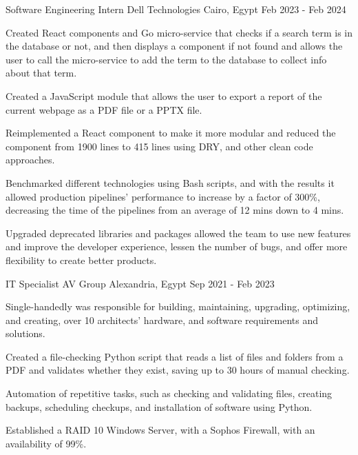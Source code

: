 \begin{cventries}
  \cventry
   {Software Engineering Intern} %
    {Dell Technologies} %
    {Cairo, Egypt} %
    {Feb 2023 - Feb 2024} %
    {
      \begin{cvitems} %
        \item {Created React components and Go micro-service that checks if a search term is in the database or not, and then displays a component if not found and allows the user to call the micro-service to add the term to the database to collect info about that term.}
        \item {Created a JavaScript module that allows the user to export a report of the current webpage as a PDF file or a PPTX file.}
        \item {Reimplemented a React component to make it more modular and reduced the component from 1900 lines to 415 lines using DRY, and other clean code approaches.}
        \item{Benchmarked different technologies using Bash scripts, and with the results it allowed production pipelines’ performance to increase by a factor of 300\%, decreasing the time of the pipelines from an average of 12 mins down to 4 mins.}
        \item{Upgraded deprecated libraries and packages allowed the team to use new features and improve the developer experience, lessen the number of bugs, and offer more flexibility to create better products.}
      \end{cvitems}
    }
    
     \cventry
    {IT Specialist} %
    {AV Group} %
    {Alexandria, Egypt} %
    {Sep 2021 - Feb 2023} %
    {
      \begin{cvitems} %
      \item{Single-handedly was responsible for building, maintaining, upgrading, optimizing, and creating, over 10 architects' hardware, and software requirements and solutions.}
        \item {Created a file-checking Python script that reads a list of files and folders from a PDF and validates whether they exist, saving up to 30 hours of manual checking.}
        \item {Automation of repetitive tasks, such as checking and validating files, creating backups, scheduling checkups, and installation of software using Python.}
        \item {Established a RAID 10 Windows Server, with a Sophos Firewall, with an availability of 99\%.}
      \end{cvitems}
    }
    

\end{cventries}
